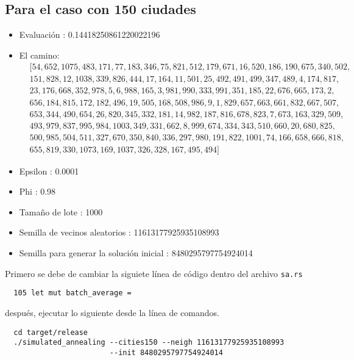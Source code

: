 \documentclass[a4paper]{article}
\begin{document}
\subsection*{Para el caso con 150 ciudades}
\begin{itemize}
\item Evaluaci\'on : 0.14418250861220022196
\item El camino:
  \begin{align*}
    &[54, 652, 1075, 483, 171, 77, 183, 346, 75, 821, 512, 179, 671, 16, 520, 186, 190, 675, 340, 502,\\
    &151, 828, 12, 1038, 339, 826, 444, 17, 164, 11, 501, 25, 492, 491, 499, 347, 489, 4, 174, 817,\\
    &23, 176, 668, 352, 978, 5, 6, 988, 165, 3, 981, 990, 333, 991, 351, 185, 22, 676, 665, 173, 2,\\
    &656, 184, 815, 172, 182, 496, 19, 505, 168, 508, 986, 9, 1, 829, 657, 663, 661, 832, 667, 507,\\
    &653, 344, 490, 654, 26, 820, 345, 332, 181, 14, 982, 187, 816, 678, 823, 7, 673, 163, 329, 509,\\
    &493, 979, 837, 995, 984, 1003, 349, 331, 662, 8, 999, 674, 334, 343, 510, 660, 20, 680, 825,\\
    &500, 985, 504, 511, 327, 670, 350, 840, 336, 297, 980, 191, 822, 1001, 74, 166, 658, 666, 818,\\
    &655, 819, 330, 1073, 169, 1037, 326, 328, 167, 495, 494]
  \end{align*}
  
\item Epsilon : 0.0001
\item Phi : 0.98
\item Tamaño de lote : 1000
\item Semilla de vecinos aleatorios : 11613177925935108993
\item Semilla para generar la soluci\'on inicial : 8480295797754924014
\end{itemize}
Primero se debe de cambiar la siguiete l\'inea de c\'odigo dentro del archivo \texttt{sa.rs}
\begin{lstlisting}
  105 let mut batch_average = 
\end{lstlisting}

despu\'es, ejecutar lo siguiente desde la l\'inea de comandos.
\begin{lstlisting}
  cd target/release
  ./simulated_annealing --cities150 --neigh 11613177925935108993
                        --init 8480295797754924014
                      \end{lstlisting}
\end{document}

